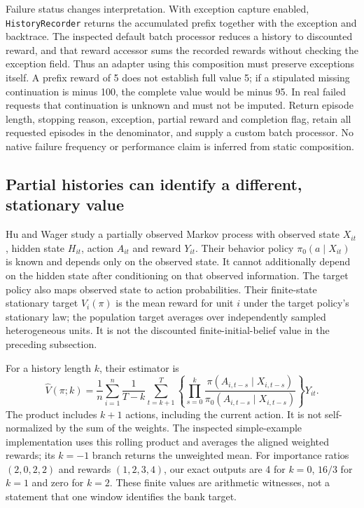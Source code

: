 Failure status changes interpretation. With exception capture enabled,
\texttt{HistoryRecorder} returns the accumulated prefix together with the
exception and backtrace. The inspected default batch processor reduces a
history to discounted reward, and that reward accessor sums the recorded
rewards without checking the exception field. Thus an adapter using this
composition must preserve exceptions itself. A prefix reward of 5 does not
establish full value 5; if a stipulated missing continuation is minus 100,
the complete value would be minus 95. In real failed requests that continuation
is unknown and must not be imputed. Return episode length, stopping reason,
exception, partial reward and completion flag, retain all requested episodes
in the denominator, and supply a custom batch processor. No native failure
frequency or performance claim is inferred from static composition.
\citep{exec24_policyother_tools,exec24_policyother_contract}

\subsection{Partial histories can identify a different, stationary value}
Hu and Wager study a partially observed Markov process with observed state
$X_{it}$, hidden state $H_{it}$, action $A_{it}$ and reward $Y_{it}$. Their
behavior policy $\pi_0(a\mid X_{it})$ is known and depends only on the observed
state. It cannot additionally depend on the hidden state after conditioning
on that observed information. The target policy also maps observed state to
action probabilities. Their finite-state stationary target $V_i(\pi)$ is the
mean reward for unit $i$ under the target policy's stationary law; the
population target averages over independently sampled heterogeneous units.
It is not the discounted finite-initial-belief value in the preceding subsection.
\citep{exec24_policyother_original}

For a history length $k$, their estimator is
\[
 \widehat V(\pi;k)=\frac1n\sum_{i=1}^n\frac1{T-k}
 \sum_{t=k+1}^{T}\left\{\prod_{s=0}^{k}
 \frac{\pi(A_{i,t-s}\mid X_{i,t-s})}
      {\pi_0(A_{i,t-s}\mid X_{i,t-s})}\right\}Y_{it}.
\]
The product includes $k+1$ actions, including the current action. It is not
self-normalized by the sum of the weights. The inspected simple-example
implementation uses this rolling product and averages the aligned weighted
rewards; its $k=-1$ branch returns the unweighted mean. For importance ratios
$(2,0,2,2)$ and rewards $(1,2,3,4)$, our exact outputs are 4 for $k=0$,
$16/3$ for $k=1$ and zero for $k=2$. These finite values are arithmetic
witnesses, not a statement that one window identifies the bank target.
\citep{exec24_policyother_original,exec24_policyother_ope,exec24_policyother_contract}

